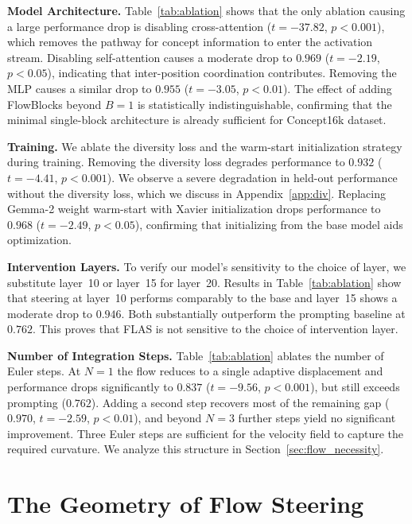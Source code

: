 \documentclass{article}
\begin{document}
\textbf{Model Architecture.} Table~\ref{tab:ablation} shows that the only ablation causing a large performance drop is disabling cross-attention ($t = -37.82$, $p < 0.001$), which removes the pathway for concept information to enter the activation stream. Disabling self-attention causes a moderate drop to $0.969$ ($t = -2.19$, $p < 0.05$), indicating that inter-position coordination contributes. Removing the MLP causes a similar drop to $0.955$ ($t = -3.05$, $p < 0.01$). The effect of adding FlowBlocks beyond $B\!=\!1$ is statistically indistinguishable, confirming that the minimal single-block architecture is already sufficient for Concept16k dataset. 

\textbf{Training.} We ablate the diversity loss and the warm-start initialization strategy during training. Removing the diversity loss degrades performance to $0.932$ ($t = -4.41$, $p < 0.001$). We observe a severe degradation in held-out performance without the diversity loss, which we discuss in Appendix~\ref{app:div}. Replacing Gemma-2 weight warm-start with Xavier initialization drops performance to $0.968$ ($t = -2.49$, $p < 0.05$), confirming that initializing from the base model aids optimization.

\textbf{Intervention Layers.} To verify our model's sensitivity to the choice of layer, we substitute layer~10 or layer~15 for layer~20. Results in Table~\ref{tab:ablation} show that steering at layer~10 performs comparably to the base and layer~15 shows a moderate drop to $0.946$. Both substantially outperform the prompting baseline at $0.762$. This proves that FLAS is not sensitive to the choice of intervention layer.

\textbf{Number of Integration Steps.} Table~\ref{tab:ablation} ablates the number of Euler steps. At $N\!=\!1$ the flow reduces to a single adaptive displacement and performance drops significantly to $0.837$ ($t = -9.56$, $p < 0.001$), but still exceeds prompting ($0.762$). Adding a second step recovers most of the remaining gap ($0.970$, $t = -2.59$, $p < 0.01$), and beyond $N\!=\!3$ further steps yield no significant improvement. Three Euler steps are sufficient for the velocity field to capture the required curvature. We analyze this structure in Section~\ref{sec:flow_necessity}.

\section{The Geometry of Flow Steering}
\label{sec:analysis}
\end{document}
